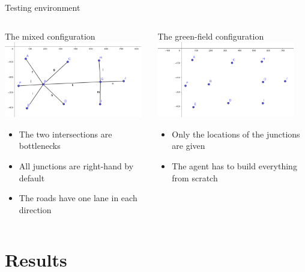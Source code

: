 \documentclass[english, aspectratio=169]{beamer}
\begin{document}
\begin{frame}{Testing environment}
\begin{columns}

\begin{column}{0.5\textwidth}
	\begin{center}
	The mixed configuration
	\includegraphics[width=6cm, keepaspectratio]{images/test_5_intersection.png}
	\end{center}
	\begin{itemize}
		\item The two intersections are bottlenecks
		\item All junctions are right-hand by default
		\item The roads have one lane in each direction
	\end{itemize}
\end{column}

\begin{column}{0.5\textwidth}
	\begin{center}
	The green-field configuration
	\includegraphics[width=6cm, keepaspectratio]{images/test_5_intersection_empty.png}
	\end{center}
	\begin{itemize}
		\item Only the locations of the junctions are given
		\item The agent has to build everything from scratch
	\end{itemize}
\end{column}

\end{columns}
\end{frame}

\section{Results}
\end{document}
